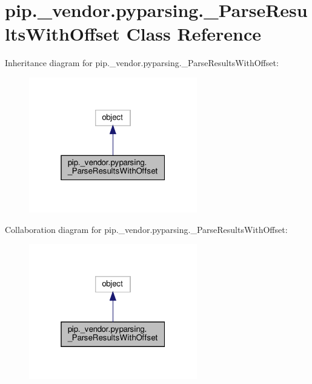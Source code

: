\hypertarget{classpip_1_1__vendor_1_1pyparsing_1_1__ParseResultsWithOffset}{}\section{pip.\+\_\+vendor.\+pyparsing.\+\_\+\+Parse\+Results\+With\+Offset Class Reference}
\label{classpip_1_1__vendor_1_1pyparsing_1_1__ParseResultsWithOffset}


Inheritance diagram for pip.\+\_\+vendor.\+pyparsing.\+\_\+\+Parse\+Results\+With\+Offset\+:
\nopagebreak
\begin{figure}[H]
\begin{center}
\leavevmode
\includegraphics[width=208pt]{classpip_1_1__vendor_1_1pyparsing_1_1__ParseResultsWithOffset__inherit__graph}
\end{center}
\end{figure}


Collaboration diagram for pip.\+\_\+vendor.\+pyparsing.\+\_\+\+Parse\+Results\+With\+Offset\+:
\nopagebreak
\begin{figure}[H]
\begin{center}
\leavevmode
\includegraphics[width=208pt]{classpip_1_1__vendor_1_1pyparsing_1_1__ParseResultsWithOffset__coll__graph}
\end{center}
\end{figure}
